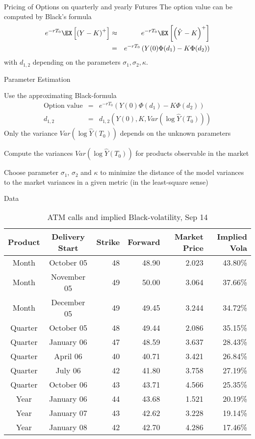 {Pricing of Options on quarterly and yearly Futures}
The option value can be computed by Black's formula
\begin{eqnarray*}
e^{-rT_0}\EX\left[\left(Y-K\right)^+\right]&\approx & e^{-rT_0}\EX\left[\left(\hat{Y}-K\right)^+\right]\\
& = &e^{-rT_0}\left(Y(0)\Phi(d_1) - K\Phi(d_2)\right)
\end{eqnarray*}
with $d_{1,2}$ depending on the parameters $\sigma_1, \sigma_2, \kappa$.

{Parameter Estimation}






	Use the approximating Black-formula
    \begin{eqnarray*}
        \textrm{Option value}&=&    e^{-rT_0}\left(Y(0)\Phi (d_1)-K\Phi(d_2) \right)
\\
        d_{1,2} & = & d_{1,2}\left(Y(0),K,Var(\log \hat{Y}(T_0))\right)
    \end{eqnarray*}
        Only the variance $Var(\log \hat{Y}(T_0))$ depends on the unknown parameters



	Compute the variances $Var(\log\hat{Y}(T_0))$ for products observable in the market


	Choose parameter $\sigma_1$, $\sigma_2$ and $\kappa$ to minimize the distance of the model variances
to the market variances in a given metric (in the least-square sense)





{Data}
{\small \begin{table}[btp]
\begin{center}
\begin{tabular}{ccrrrr}
Product     & Delivery Start    & Strike    &   Forward & Market Price  &Implied Vola \\
\hline
Month   &October 05     &48 &48.90&2.023&43.80\%\\
Month   &November 05        &49 &50.00&3.064&37.66\%\\
Month   &December 05        &49 &49.45&3.244&34.72\%\\
\hline
Quarter & October 05        &48 &49.44&2.086&35.15\%\\
Quarter & January 06        &47 &48.59&3.637&28.43\%\\
Quarter & April 06          &40 &40.71&3.421&26.84\%\\
Quarter & July 06           &42 &41.80&3.758&27.19\%\\
Quarter & October 06        &43 &43.71&4.566&25.35\%\\
\hline
Year    &January 06     &44 &43.68&1.521&20.19\%\\
Year    &January 07     &43 &42.62&3.228&19.14\%\\
Year    &January 08     &42 &42.70&4.286&17.46\%\\
\end{tabular}
\caption{ATM calls and implied Black-volatility, Sep 14}
\label{fig:data}
\end{center}
\end{table}
}

